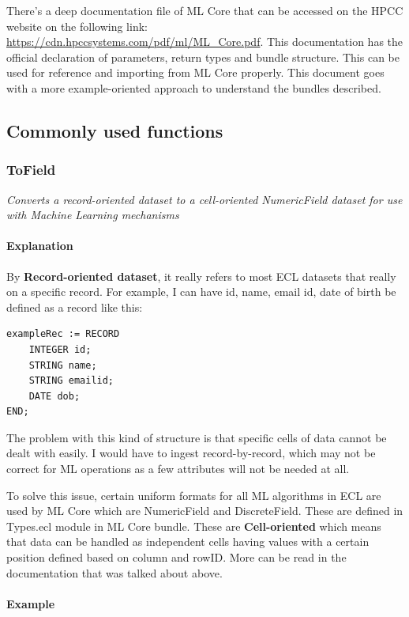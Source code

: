 There's a deep documentation file of ML Core that can be accessed on the HPCC website on the following link: \url{https://cdn.hpccsystems.com/pdf/ml/ML\_Core.pdf}. This documentation has the official declaration of parameters, return types and bundle structure. This can be used for reference and importing from ML Core properly. This document goes with a more example-oriented approach to understand the bundles described.

\subsection{Commonly used functions}

\subsubsection{ToField}\label{mlcore:tofield}

\textit{Converts a record-oriented dataset to a cell-oriented NumericField dataset for use with Machine Learning mechanisms}

\paragraph{Explanation}

By \textbf{Record-oriented dataset}, it really refers to most ECL datasets that really on a specific record. For example, I can have id, name, email id, date of birth be defined as a record like this:

\begin{lstlisting}
exampleRec := RECORD
    INTEGER id;
    STRING name;
    STRING emailid;
    DATE dob;
END;
\end{lstlisting}

The problem with this kind of structure is that specific cells of data cannot be dealt with easily. I would have to ingest record-by-record, which may not be correct for ML operations as a few attributes will not be needed at all.

To solve this issue, certain uniform formats for all ML algorithms in ECL are used by ML Core which are NumericField and DiscreteField. These are defined in Types.ecl module in ML Core bundle. These are \textbf{Cell-oriented} which means that data can be handled as independent cells having values with a certain position defined based on column and rowID. More can be read in the documentation that was talked about above.

\paragraph{Example}

